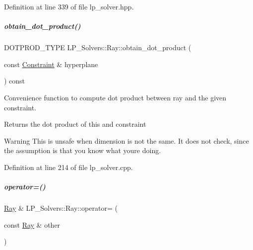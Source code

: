Definition at line 339 of file lp\+\_\+solver.\+hpp.

\mbox{\label{group___c_l_s_solvers_a431363fc157d5a8df8b180ac671e19ea}} 
\subparagraph{\texorpdfstring{obtain\+\_\+dot\+\_\+product()}{obtain\_dot\_product()}}
{\footnotesize\ttfamily D\+O\+T\+P\+R\+O\+D\+\_\+\+T\+Y\+PE L\+P\+\_\+\+Solvers\+::\+Ray\+::obtain\+\_\+dot\+\_\+product (\begin{DoxyParamCaption}\item[{const \hyperlink{group___c_l_s_solvers_class_l_p___solvers_1_1_constraint}{Constraint} \&}]{hyperplane }\end{DoxyParamCaption}) const}



Convenience function to compute dot product between ray and the given constraint. 

\begin{DoxyReturn}{Returns}
the dot product of {\ttfamily this} and {\ttfamily constraint} 
\end{DoxyReturn}
\begin{DoxyWarning}{Warning}
This is unsafe when dimension is not the same. It does not check, since the assumption is that you know what you\textquotesingle{}re doing. 
\end{DoxyWarning}


Definition at line 214 of file lp\+\_\+solver.\+cpp.

\mbox{\label{group___c_l_s_solvers_ae70a9ad73b8788c53e0b1cc7c2cdae27}} 
\subparagraph{\texorpdfstring{operator=()}{operator=()}}
{\footnotesize\ttfamily \hyperlink{group___c_l_s_solvers_class_l_p___solvers_1_1_ray}{Ray} \& L\+P\+\_\+\+Solvers\+::\+Ray\+::operator= (\begin{DoxyParamCaption}\item[{const \hyperlink{group___c_l_s_solvers_class_l_p___solvers_1_1_ray}{Ray} \&}]{other }\end{DoxyParamCaption})}



